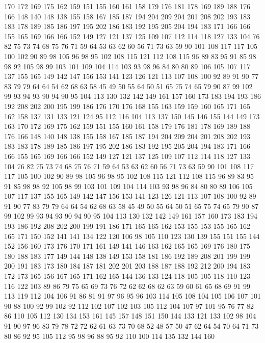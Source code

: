 170 172 169 175 162 159 151 155 160 161 158 179 176 181 178 169 189 188 176 166
148 140 148 138 155 158 167 185 187 194 204 209 204 201 208 202 193 183 183 178
189 185 186 197 195 202 186 183 192 195 205 204 194 183 171 166 166 155 165 169
166 166 152 149 127 121 137 125 109 107 112 114 118 127 133 104 76 82 75 73
74 68 75 76 71 59 64 53 63 62 60 56 71 73 63 59 90 101 108 117
117 105 100 102 90 89 98 105 96 98 95 102 108 115 121 112 108 115 96 89
83 95 91 85 98 98 92 105 98 99 103 101 109 104 114 103 93 98 96 84
80 80 89 106 105 107 117 137 155 165 149 142 147 156 153 141 123 126 121 113
107 108 100 92 89 91 90 77 83 79 79 64 64 54 62 68 63 58 45 49
50 55 64 50 51 65 75 74 65 79 90 87 99 102 99 93 94 93 90 94
90 95 104 113 130 132 142 149 161 157 160 173 183 194 193 186 192 208 202 200
195 199 186 176 170 176 168 155 163 159 159 160 165 171 165 162 158 137 131 133
121 124 95 112 116 104 113 137 150 145 146 155 144 149 173 163 170 172 169 175
162 159 151 155 160 161 158 179 176 181 178 169 189 188 176 166 148 140 148 138
155 158 167 185 187 194 204 209 204 201 208 202 193 183 183 178 189 185 186 197
195 202 186 183 192 195 205 204 194 183 171 166 166 155 165 169 166 166 152 149
127 121 137 125 109 107 112 114 118 127 133 104 76 82 75 73 74 68 75 76
71 59 64 53 63 62 60 56 71 73 63 59 90 101 108 117 117 105 100 102
90 89 98 105 96 98 95 102 108 115 121 112 108 115 96 89 83 95 91 85
98 98 92 105 98 99 103 101 109 104 114 103 93 98 96 84 80 80 89 106
105 107 117 137 155 165 149 142 147 156 153 141 123 126 121 113 107 108 100 92
89 91 90 77 83 79 79 64 64 54 62 68 63 58 45 49 50 55 64 50
51 65 75 74 65 79 90 87 99 102 99 93 94 93 90 94 90 95 104 113
130 132 142 149 161 157 160 173 183 194 193 186 192 208 202 200 199 191 186 171
165 165 162 153 155 153 155 165 162 165 171 150 152 141 141 134 122 120 106 98
105 110 123 130 139 155 151 155 144 152 156 160 173 176 170 171 161 149 141 146
163 162 165 165 169 176 180 175 180 188 183 177 149 144 148 138 149 153 158 181
186 192 189 208 201 199 199 200 191 183 173 180 184 187 181 202 201 203 188 187
188 192 212 200 194 183 172 173 165 156 167 165 171 162 165 144 136 133 124 118
105 105 118 110 123 116 122 103 89 86 79 75 65 69 73 76 72 62 62 68
62 63 59 60 61 65 68 69 91 99 113 119 112 104 106 91 86 81 91 97
96 95 96 103 114 105 108 104 105 106 107 101 90 88 100 92 99 102 92 112
102 107 102 103 105 112 104 107 97 101 95 76 77 82 86 110 105 112 130 134
153 161 145 157 148 151 150 144 133 121 133 102 98 104 91 90 97 96 83 79
78 72 72 62 61 63 73 70 68 52 48 57 50 47 62 64 54 70 64 71
73 80 86 92 95 105 112 95 98 96 88 95 92 110 100 114 135 132 144 160

